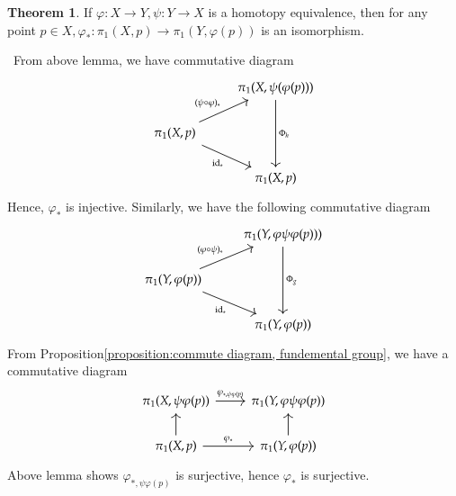 \documentclass[12pt,a4paper]{book}
\newenvironment{prooff}{{\noindent\it\textcolor{cyan!40!black}{Proof}:}\,}{\par}
\theoremstyle{definition}
\newtheorem{theo}[defn]{Theorem}
\begin{document}
\begin{theo}
    If $\varphi: X \rightarrow Y, \psi:Y\rightarrow X$ 
    is a homotopy equivalence, then for any point $p \in X, \varphi_*: \pi_1(X, p) \rightarrow \pi_1(Y, \varphi(p))$ is an isomorphism.
    \label{theorem: homotopy equivanlece induces fundamental group isomorphism}
\end{theo}
\begin{prooff}
    From above lemma, we have commutative diagram 
    \[\begin{tikzcd}
        & {\pi_1(X,\psi(\varphi (p)))} \\
        {\pi_1(X,p)} \\
        & {\pi_1(X,p)}
        \arrow["{\Phi_h}", from=1-2, to=3-2]
        \arrow["{(\psi\circ\varphi)_*}", from=2-1, to=1-2]
        \arrow["{\text{id}_*}"', from=2-1, to=3-2]
    \end{tikzcd}\]
    Hence, $\varphi_*$ is injective. Similarly, we have the following commutative diagram 
\[\begin{tikzcd}
	& {\pi_1(Y,\varphi\psi\varphi (p)))} \\
	{\pi_1(Y,\varphi(p))} \\
	& {\pi_1(Y,\varphi(p))}
	\arrow["{\Phi_g}", from=1-2, to=3-2]
	\arrow["{(\varphi\circ\psi)_*}", from=2-1, to=1-2]
	\arrow["{\text{id}_*}"', from=2-1, to=3-2]
\end{tikzcd}\]
    From Proposition\ref{proposition:commute diagram, fundemental group}, we have a commutative diagram 
\[\begin{tikzcd}
	{\pi_1(X,\psi\varphi(p))} & {\pi_1(Y,\varphi\psi\varphi(p))} \\
	{\pi_1(X,p)} & {\pi_1(Y,\varphi(p))}
	\arrow["{\varphi_{*,\psi\varphi(p)}}", from=1-1, to=1-2]
	\arrow[from=2-1, to=1-1]
	\arrow["{\varphi_*}", from=2-1, to=2-2]
	\arrow[from=2-2, to=1-2]
\end{tikzcd}\]
Above lemma shows $\varphi_{*,\psi\varphi(p)}$ is surjective, hence $\varphi_*$ is surjective. 




\end{prooff}
\end{document}
